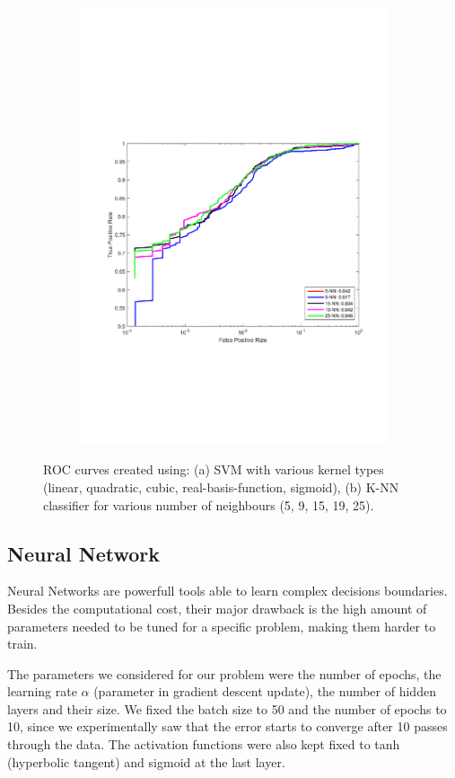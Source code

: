 \begin{figure}[h]
\begin{subfigure}[b]{0.49\textwidth}
    \includegraphics[width=\textwidth]{figures/K_NN.pdf}
    \caption{}
    \label{fig:K_NN}
  \end{subfigure}
  \caption{ROC curves created using: (a) SVM with various kernel types (linear, quadratic, cubic, real-basis-function, sigmoid), (b) K-NN classifier for various number of neighbours (5, 9, 15, 19, 25).}
\end{figure}
\subsection{Neural Network}
Neural Networks are powerfull tools able to learn complex decisions boundaries. Besides the computational cost, their major drawback is the high amount of parameters needed to be tuned for a specific problem, making them harder to train.

The parameters we considered for our problem were the number of epochs, the learning rate $\alpha$ (parameter in gradient descent update), the number of hidden layers and their size. We fixed the batch size to 50 and the number of epochs to 10, since we experimentally saw that the error starts to converge after 10 passes through the data. The activation functions were also kept fixed to tanh (hyperbolic tangent) and sigmoid at the last layer. 

